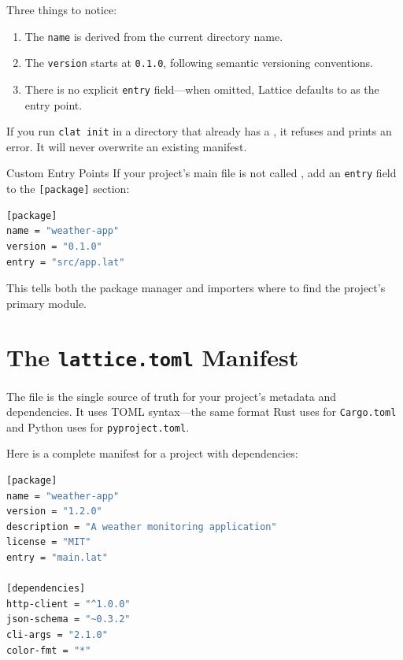Three things to notice:

\begin{enumerate}
  \item The \texttt{name} is derived from the current directory name.
  \item The \texttt{version} starts at \texttt{0.1.0}, following semantic versioning conventions.
  \item There is no explicit \texttt{entry} field---when omitted, Lattice defaults to  as the entry point.
\end{enumerate}

If you run \lstinline|clat init| in a directory that already has a , it refuses and prints an error.
It will never overwrite an existing manifest.

\begin{tipbox}{Custom Entry Points}
If your project's main file is not called , add an \texttt{entry} field to the \texttt{[package]} section:

\begin{lstlisting}[language=bash, numbers=none]
[package]
name = "weather-app"
version = "0.1.0"
entry = "src/app.lat"
\end{lstlisting}

This tells both the package manager and importers where to find the project's primary module.
\end{tipbox}

\section{The \texttt{lattice.toml} Manifest}\label{sec:lattice-toml}

The  file is the single source of truth for your project's metadata and dependencies.
It uses TOML syntax---the same format Rust uses for \texttt{Cargo.toml} and Python uses for \texttt{pyproject.toml}.

Here is a complete manifest for a project with dependencies:

\begin{lstlisting}[language=bash, numbers=none, caption={A lattice.toml with metadata and dependencies}]
[package]
name = "weather-app"
version = "1.2.0"
description = "A weather monitoring application"
license = "MIT"
entry = "main.lat"

[dependencies]
http-client = "^1.0.0"
json-schema = "~0.3.2"
cli-args = "2.1.0"
color-fmt = "*"
\end{lstlisting}

